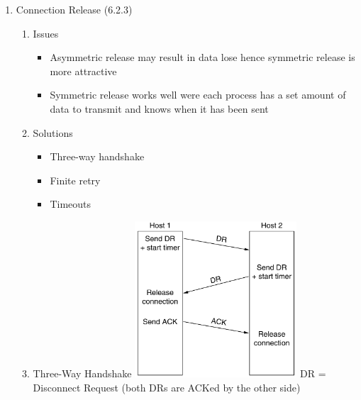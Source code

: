 \documentclass[a4paper,10pt]{article}
\begin{document}
\begin{enumerate}
  \item Connection Release (6.2.3)
    \begin{enumerate}
      \item Issues
        \begin{itemize}
          \item Asymmetric release may result in data lose hence symmetric release is more attractive
          \item Symmetric release works well were each process has a set amount of data to transmit and knows when it has been sent
        \end{itemize}
      \item Solutions
        \begin{itemize}
          \item Three-way handshake
          \item Finite retry
          \item Timeouts
        \end{itemize}
      \item Three-Way Handshake
        \newline\includegraphics[width=0.50\textwidth]{3wayrelease}
        \newline DR = Disconnect Request (both DRs are ACKed by the other side)
    \end{enumerate}


\end{enumerate}
\end{document}
